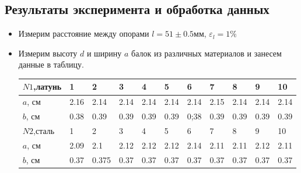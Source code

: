 \documentclass[a4paper,12pt]{article} %
\begin{document}
\subsection{Результаты эксперимента и обработка данных}

\begin{itemize}
    \item Измерим расстояние между опорами $l= 51 \pm 0.5 $мм, $\varepsilon_{l}= 1 \%$
    \item Измерим высоту $d$ и ширину $a$ балок из различных материалов и занесем данные в таблицу.

\begin{table}[!h]
    \begin{center}  
    \begin{tabular}{|l|l|l|l|l|l|l|l|l|l|l|} \hline
        $N1$,латунь & 1    & 2     & 3    & 4    & 5    & 6    & 7    & 8    & 9    & 10   \\ \hline
        $a$, см     & 2.16 & 2.14  & 2.14 & 2.14 & 2.14 & 2.14 & 2.15 & 2.14 & 2.14 & 2.14 \\ \hline
        $b$, см     & 0.38 & 0.39  & 0.39 & 0.39 & 0.39 & 0;38 & 0.39 & 0.39 & 0.39 & 0.39 \\ \hline
        $N2$,сталь  & 1    & 2     & 3    & 4    & 5    & 6    & 7    & 8    & 9    & 10   \\ \hline
        $a$, см     & 2.09 & 2.1   & 2.12 & 2.12 & 2.12 & 2.14 & 2.11 & 2.11 & 2.12 & 2.11 \\ \hline
        $b$, см     & 0.37 & 0.375 & 0.37 & 0.37 & 0.37 & 0.37 & 0.37 & 0.37 & 0.37 & 0.37 \\ \hline
    \end{tabular}
    \end{center}
\end{table}


\end{itemize}
\end{document}
